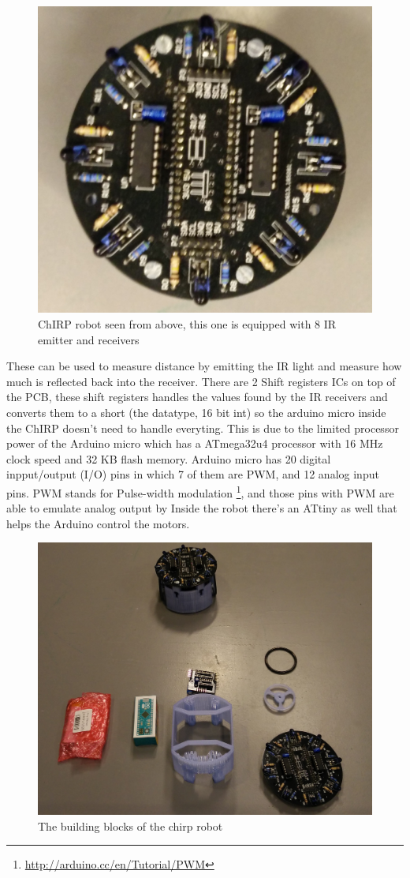 \begin{figure}[H]
\centering
\includegraphics[width=0.8\linewidth]{images/chirpAbove.jpg}
\caption[ChIRP robot seen from above]{ChIRP robot seen from above, this one is equipped with 8 IR emitter and receivers}
\label{fig:chirpAbove}
\end{figure}
These can be used to measure distance by emitting the IR light and measure how much is reflected back into the receiver. There are 2 Shift registers ICs on top of the PCB, these shift registers handles the values found by the IR receivers and converts them to a short (the datatype, 16 bit int) so the arduino micro inside the ChIRP doesn't need to handle everyting. This is due to the limited processor power of the Arduino micro which has a ATmega32u4 processor with 16 MHz clock speed and 32 KB flash memory. Arduino micro has 20 digital inpput/output (I/O) pins in which 7 of them are PWM, and 12 analog input pins. PWM stands for Pulse-width modulation \footnote{\href{http://arduino.cc/en/Tutorial/PWM}{http://arduino.cc/en/Tutorial/PWM}}, and those pins with PWM are able to emulate analog output by 
Inside the robot there's an ATtiny as well that helps the Arduino control the motors.  
\begin{figure}[H]
	\centering
	\includegraphics[width=0.8\linewidth]{images/chirpPieces}
	\caption[ChIRP pieces]{The building blocks of the chirp robot}
\end{figure}


